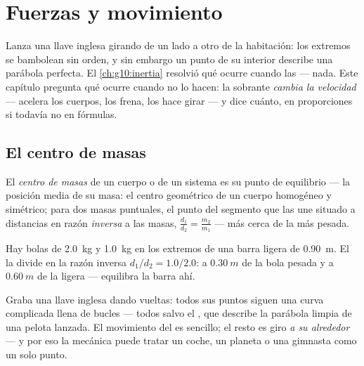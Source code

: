 \chapter{Fuerzas y movimiento}\label{ch:g11:forces-and-motion}

Lanza una llave inglesa girando de un lado a otro de la habitación: los
extremos se bambolean sin orden, y sin embargo un punto de su interior
describe una parábola perfecta. El \cref{ch:g10:inertia} resolvió qué
ocurre cuando las   --- nada. Este capítulo pregunta
qué ocurre cuando no lo hacen: la  sobrante \emph{cambia la
velocidad} --- acelera los cuerpos, los frena, los hace girar --- y dice
cuánto, en proporciones si todavía no en fórmulas.

\section{El centro de masas}

\begin{definition}\label{def:g11:forces-and-motion:com}
El \emph{centro de masas} de un cuerpo o de un
sistema es su punto de equilibrio --- la posición media de su masa: el
centro geométrico de un cuerpo homogéneo y simétrico; para dos masas
puntuales, el punto del segmento que las une situado a distancias en
razón \emph{inversa} a las masas,
$\frac{d_1}{d_2} = \frac{m_2}{m_1}$ --- más cerca de la más pesada.
\end{definition}

\begin{example}\label{ex:g11:forces-and-motion:dumbbell}
Hay bolas de \qty{2.0}{kg} y \qty{1.0}{kg} en los extremos de una barra
ligera de \qty{0.90}{m}. El  la divide en la razón
inversa $d_1/d_2 = 1.0/2.0$: a $\qty{0.30}{m}$ de la bola pesada y a
$\qty{0.60}{m}$ de la ligera --- equilibra la barra ahí.
\end{example}

\begin{remark}\label{rem:g11:forces-and-motion:wrench}
Graba una llave inglesa dando vueltas: todos sus puntos siguen una curva
complicada llena de bucles --- todos salvo el , que
describe la parábola limpia de una pelota lanzada. El movimiento del
 es sencillo; el resto es giro \emph{a su alrededor} ---
y por eso la mecánica puede tratar un coche, un planeta o una gimnasta
como un solo punto.
\end{remark}

